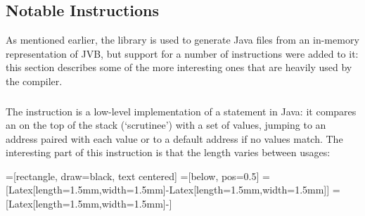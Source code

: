 \documentclass[dissertation.tex]{subfiles}
\begin{document}
{    \subsection{Notable Instructions}
    {

        As mentioned earlier, the  library is used to generate Java  files from an in-memory representation of JVB, but support for a number of instructions were added to it: this section describes some of the more interesting ones that are heavily used by the compiler. 

        \subsubsection{}
        {
            The  instruction is a low-level implementation of a  statement in Java: it compares an  on the top of the stack (`scrutinee') with a set of values, jumping to an address paired with each value or to a default address if no values match. The interesting part of this instruction is that the length varies between usages:

            =[rectangle, draw=black, text centered]
            =[below, pos=0.5]
            =[{Latex[length=1.5mm,width=1.5mm]}-{Latex[length=1.5mm,width=1.5mm]}]
            =[{Latex[length=1.5mm,width=1.5mm]}-]

            \begin{figure}[h]
\end{figure}}}}
\end{document}
